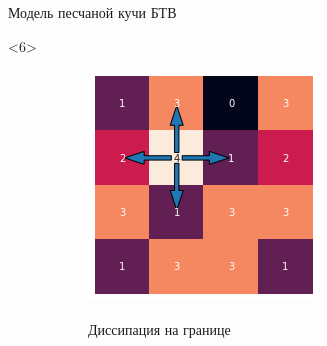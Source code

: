 \documentclass{beamer}
\begin{document}
\begin{frame}{Модель песчаной кучи БТВ}
		\begin{onlyenv}<6>
			\begin{figure}[ht]
				\centering
				\begin{subfigure}{0.45\textwidth}
					\includegraphics[width=\linewidth]{slides/btw_5}
				\end{subfigure}
				\begin{subfigure}{0.45\textwidth}
					Диссипация на границе
				\end{subfigure}
			\end{figure}
		\end{onlyenv}
	

\end{frame}
\end{document}
